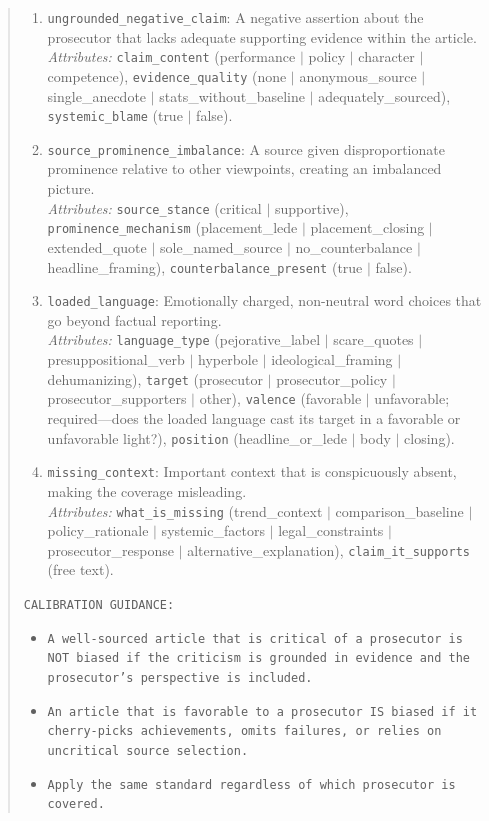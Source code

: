 \documentclass[12pt, letterpaper]{article}
\begin{document}
\begin{appendices}
\begin{quote}
\begin{enumerate}[leftmargin=*]
\item \texttt{ungrounded\_negative\_claim}: A negative assertion about the prosecutor that lacks adequate supporting evidence within the article.\\
\emph{Attributes:} \texttt{claim\_content} (performance $|$ policy $|$ character $|$ competence), \texttt{evidence\_quality} (none $|$ anonymous\_source $|$ single\_anecdote $|$ stats\_without\_baseline $|$ adequately\_sourced), \texttt{systemic\_blame} (true $|$ false).

\item \texttt{source\_prominence\_imbalance}: A source given disproportionate prominence relative to other viewpoints, creating an imbalanced picture.\\
\emph{Attributes:} \texttt{source\_stance} (critical $|$ supportive), \texttt{prominence\_mechanism} (placement\_lede $|$ placement\_closing $|$ extended\_quote $|$ sole\_named\_source $|$ no\_counterbalance $|$ headline\_framing), \texttt{counterbalance\_present} (true $|$ false).

\item \texttt{loaded\_language}: Emotionally charged, non-neutral word choices that go beyond factual reporting.\\
\emph{Attributes:} \texttt{language\_type} (pejorative\_label $|$ scare\_quotes $|$ presuppositional\_verb $|$ hyperbole $|$ ideological\_framing $|$ dehumanizing), \texttt{target} (prosecutor $|$ prosecutor\_policy $|$ prosecutor\_supporters $|$ other), \texttt{valence} (favorable $|$ unfavorable; required---does the loaded language cast its target in a favorable or unfavorable light?), \texttt{position} (headline\_or\_lede $|$ body $|$ closing).

\item \texttt{missing\_context}: Important context that is conspicuously absent, making the coverage misleading.\\
\emph{Attributes:} \texttt{what\_is\_missing} (trend\_context $|$ comparison\_baseline $|$ policy\_rationale $|$ systemic\_factors $|$ legal\_constraints $|$ prosecutor\_response $|$ alternative\_explanation), \texttt{claim\_it\_supports} (free text).
\end{enumerate}

\texttt{CALIBRATION GUIDANCE:}
\begin{itemize}[leftmargin=*]
\item \texttt{A well-sourced article that is critical of a prosecutor is NOT biased if the criticism is grounded in evidence and the prosecutor's perspective is included.}
\item \texttt{An article that is favorable to a prosecutor IS biased if it cherry-picks achievements, omits failures, or relies on uncritical source selection.}
\item \texttt{Apply the same standard regardless of which prosecutor is covered.}
\end{itemize}


\end{quote}
\end{appendices}
\end{document}
